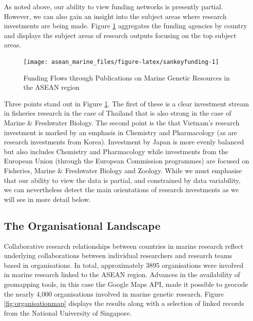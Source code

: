 \documentclass[]{book}
\theoremstyle{definition}
\theoremstyle{definition}
\theoremstyle{definition}
\theoremstyle{remark}
\begin{document}
As noted above, our ability to view funding networks is presently
partial. However, we can also gain an insight into the subject areas
where research investments are being made. Figure
\ref{fig:sankeyfunding} aggregates the funding agencies by country and
displays the subject areas of research outputs focusing on the top
subject areas.

\begin{figure}

{\centering \texttt{[image: asean\_marine\_files/figure-latex/sankeyfunding-1]} 

}

\caption{Funding Flows through Publications on Marine Genetic Resources in the ASEAN region}\label{fig:sankeyfunding}
\end{figure}

Three points stand out in Figure \ref{fig:sankeyfunding}. The first of
these is a clear investment stream in fisheries research in the case of
Thailand that is also strong in the case of Marine \& Freshwater
Biology. The second point is the that Vietnam's research investment is
marked by an emphasis in Chemistry and Pharmacology (as are research
investments from Korea). Investment by Japan is more evenly balanced but
also includes Chemistry and Pharmacology while investments from the
European Union (through the European Commission programmes) are focused
on Fisheries, Marine \& Freshwater Biology and Zoology. While we must
emphasise that our ability to view the data is partial, and constrained
by data variability, we can nevertheless detect the main orientations of
research investments as we will see in more detail below.

\hypertarget{the-organisational-landscape}{%
\subsection{The Organisational
Landscape}\label{the-organisational-landscape}}

Collaborative research relationships between countries in marine
research reflect underlying collaborations between individual
researchers and research teams based in organisations. In total,
approximately 3895 organisations were involved in marine research linked
to the ASEAN region. Advances in the availability of geomapping tools,
in this case the Google Maps API, made it possible to geocode the nearly
4,000 organisations involved in marine genetic research. Figure
\ref{fig:organisationmap} displays the results along with a selection of
linked records from the National University of Singapore.
\end{document}
